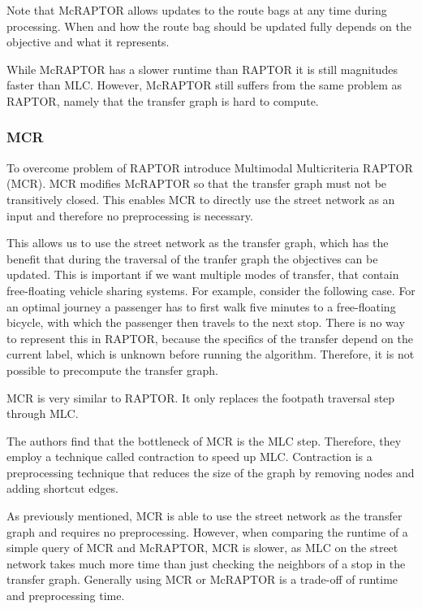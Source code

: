 Note that McRAPTOR allows updates to the route bags at any time during processing.
When and how the route bag should be updated fully depends on the objective and what it represents.

While McRAPTOR has a slower runtime than RAPTOR it is still magnitudes faster than MLC.
However, McRAPTOR still suffers from the same problem as RAPTOR, namely that the transfer graph is hard to compute.


\subsubsection{MCR}
\label{subsubsec:mcr}


To overcome problem of RAPTOR \cite{dellingComputingMultimodalJourneys2013} introduce Multimodal Multicriteria RAPTOR (MCR).
MCR modifies McRAPTOR so that the transfer graph must not be transitively closed.
This enables MCR to directly use the street network as an input and therefore no preprocessing is necessary.

This allows us to use the street network as the transfer graph, which has the benefit that during the traversal of the tranfer graph the objectives can be updated.
This is important if we want multiple modes of transfer, that contain free-floating vehicle sharing systems.
For example, consider the following case.
For an optimal journey a passenger has to first walk five minutes to a free-floating bicycle, with which the passenger then travels to the next stop.
There is no way to represent this in RAPTOR, because the specifics of the transfer depend on the current label, which is unknown before running the algorithm.
Therefore, it is not possible to precompute the transfer graph.

MCR is very similar to RAPTOR.
It only replaces the footpath traversal step through MLC.

The authors find that the bottleneck of MCR is the MLC step.
Therefore, they employ a technique called contraction  to speed up MLC.
Contraction is a preprocessing technique that reduces the size of the graph by removing nodes and adding shortcut edges.

As previously mentioned, MCR is able to use the street network as the transfer graph and requires no preprocessing.
However, when comparing the runtime of a simple query of MCR and McRAPTOR, MCR is slower, as MLC on the street network takes much more time than just checking the neighbors of a stop in the transfer graph.
Generally using MCR or McRAPTOR is a trade-off of runtime and preprocessing time.


